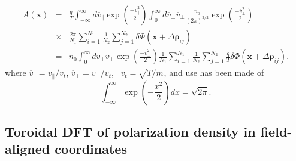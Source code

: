 \documentclass{article}
\begin{document}
\begin{eqnarray}
  A (\mathbf{x}) & = & \frac{q}{T}  \int_{- \infty}^{\infty} d
  \overline{v}_{\parallel} \exp \left( \frac{- \overline{v}^2_{\parallel}}{2}
  \right) \int_0^{\infty} d \overline{v}_{\perp} \overline{v}_{\perp}
  \frac{n_0}{(2 \pi)^{3 / 2}} \exp \left( \frac{- \overline{v}^2_{\perp}}{2}
  \right) \nonumber\\
  & \times & \frac{2 \pi}{N_1} \sum_{i = 1}^{N_1} \frac{1}{N_2}  \sum_{j =
  1}^{N_2} \delta \Phi (\mathbf{x} + \Delta \mathbf{\rho}_{i j}) \nonumber\\
  & = & n_0  \int_0^{\infty} d \overline{v}_{\perp} \overline{v}_{\perp} \exp
  \left( \frac{- \overline{v}^2_{\perp}}{2} \right) \frac{1}{N_1} \sum_{i =
  1}^{N_1} \frac{1}{N_2}  \sum_{j = 1}^{N_2} \frac{q}{T} \delta \Phi
  (\mathbf{x} + \Delta \mathbf{\rho}_{i j}) .  \label{21-9-16-a5}
\end{eqnarray}
where $\overline{v}_{\parallel} = v_{\parallel} / v_t$, $\overline{v}_{\perp}
= v_{\perp} / v_t$, \ $v_t = \sqrt{T / m}$, and use has been made of
\begin{equation}
  \int_{- \infty}^{\infty} \exp \left( - \frac{x^2}{2} \right) d x = \sqrt{2
  \pi} .
\end{equation}

\subsection{Toroidal DFT of polarization density in field-aligned coordinates}
\end{document}
